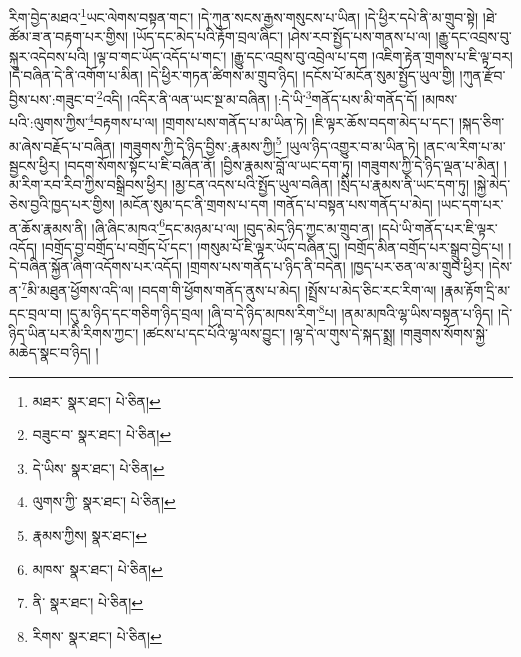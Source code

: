 རིག་བྱེད་མཐའ་\footnote{མཐར་  སྣར་ཐང་།  པེ་ཅིན། }ཡང་ལེགས་བསྟན་གང་། །དེ་ཀུན་སངས་རྒྱས་གསུངས་པ་ཡིན། །དེ་ཕྱིར་དཔེ་ནི་མ་གྲུབ་སྟེ། །ཐེ་ཚོམ་ཟ་ན་བརྟག་པར་གྱིས། །ཡོད་དང་མེད་པའི་རྟོག་བྲལ་ཞིང་། །ཤེས་རབ་སྤྱོད་པས་གནས་པ་ལ། །རྒྱུ་དང་འབྲས་བུ་སྐུར་འདེབས་པའི། །ལྟ་བ་གང་ཡོད་འདོད་པ་གང་། །རྒྱུ་དང་འབྲས་བུ་འབྲེལ་པ་དག །འཇིག་རྟེན་གྲགས་པ་ཇི་ལྟ་བར། །དེ་བཞིན་དེ་ནི་འགོག་པ་མིན། །དེ་ཕྱིར་གཏན་ཚིགས་མ་གྲུབ་ཉིད། །དངོས་པོ་མངོན་སུམ་སྤྱོད་ཡུལ་གྱི། །ཀུན་རྫོབ་བྱིས་པས་:གཟུང་བ་\footnote{བཟུང་བ་  སྣར་ཐང་།  པེ་ཅིན། }འདི། །འདིར་ནི་ལན་ཡང་སྔ་མ་བཞིན། །:དེ་ཡི་\footnote{དེ་ཡིས་  སྣར་ཐང་།  པེ་ཅིན། }གནོད་པས་མི་གནོད་དོ། །མཁས་པའི་:ལུགས་ཀྱིས་\footnote{ལུགས་ཀྱི་  སྣར་ཐང་།  པེ་ཅིན། }བརྟགས་པ་ལ། །གྲགས་པས་གནོད་པ་མ་ཡིན་ཏེ། །ཇི་ལྟར་ཆོས་བདག་མེད་པ་དང་། །སྐད་ཅིག་མ་ཞེས་བརྗོད་པ་བཞིན། །གཟུགས་ཀྱི་དེ་ཉིད་བྱིས་:རྣམས་ཀྱི།\footnote{རྣམས་ཀྱིས།  སྣར་ཐང་། } །ཡུལ་ཉིད་འགྱུར་བ་མ་ཡིན་ཏེ། །ནང་ལ་རིག་པ་མ་སྦྱངས་ཕྱིར། །བདག་སོགས་སྟོང་པ་ཇི་བཞིན་ནོ། །བྱིས་རྣམས་བློ་ལ་ཡང་དག་ཏུ། །གཟུགས་ཀྱི་དེ་ཉིད་ལྡན་པ་མིན། །མ་རིག་རབ་རིབ་ཀྱིས་བསྒྲིབས་ཕྱིར། །མྱ་ངན་འདས་པའི་སྤྱོད་ཡུལ་བཞིན། །སྲིད་པ་རྣམས་ནི་ཡང་དག་ཏུ། །སྐྱེ་མེད་ཅེས་བྱའི་ཁྱད་པར་གྱིས། །མངོན་སུམ་དང་ནི་གྲགས་པ་དག །གནོད་པ་བསྟན་པས་གནོད་པ་མེད། །ཡང་དག་པར་ན་ཆོས་རྣམས་ནི། །ཞི་ཞིང་མཁའ་\footnote{མཁས་  སྣར་ཐང་།  པེ་ཅིན། }དང་མཉམ་པ་ལ། །བུད་མེད་ཉིད་ཀྱང་མ་གྲུབ་ན། །དཔེ་ཡི་གནོད་པར་ཇི་ལྟར་འདོད། །བགྲོད་བྱ་བགྲོད་པ་བགྲོད་པོ་དང་། །གསུམ་པོ་ཇི་ལྟར་ཡོད་བཞིན་དུ། །བགྲོད་མིན་བགྲོད་པར་སྒྲུབ་བྱེད་པ། །དེ་བཞིན་སྐྱོན་ཞིག་འདོགས་པར་འདོད། །གྲགས་པས་གནོད་པ་ཉིད་ནི་བདེན། །ཁྱད་པར་ཅན་ལ་མ་གྲུབ་ཕྱིར། །དེས་ན་\footnote{ནི་  སྣར་ཐང་།  པེ་ཅིན། }མི་མཐུན་ཕྱོགས་འདི་ལ། །བདག་གི་ཕྱོགས་གནོད་ནུས་པ་མེད། །སྤྲོས་པ་མེད་ཅིང་རང་རིག་ལ། །རྣམ་རྟོག་དྲི་མ་དང་བྲལ་བ། །དུ་མ་ཉིད་དང་གཅིག་ཉིད་བྲལ། །ཞི་བ་དེ་ཉིད་མཁས་རིག་\footnote{རིགས་  སྣར་ཐང་།  པེ་ཅིན། }པ། །ནམ་མཁའི་ལྷ་ཡིས་བསྟན་པ་ཉིད། །དེ་ཉིད་ཡིན་པར་མི་རིགས་ཀྱང་། །ཚངས་པ་དང་པོའི་ལྷ་ལས་བྱུང་། །ལྷ་དེ་ལ་གུས་དེ་སྐད་སྨྲ། །གཟུགས་སོགས་སྐྱེ་མཆེད་སྣང་བ་ཉིད། །
